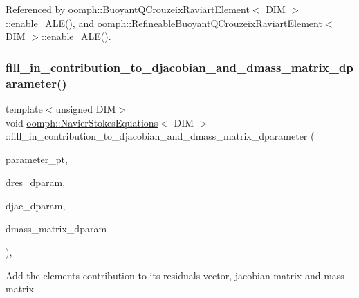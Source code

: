 Referenced by oomph\+::\+Buoyant\+Q\+Crouzeix\+Raviart\+Element$<$ D\+I\+M $>$\+::enable\+\_\+\+A\+L\+E(), and oomph\+::\+Refineable\+Buoyant\+Q\+Crouzeix\+Raviart\+Element$<$ D\+I\+M $>$\+::enable\+\_\+\+A\+L\+E().

\mbox{\label{classoomph_1_1NavierStokesEquations_afc1a9658058fb9183b89e5d3a4dabee0}} 
\subsubsection{\texorpdfstring{fill\+\_\+in\+\_\+contribution\+\_\+to\+\_\+djacobian\+\_\+and\+\_\+dmass\+\_\+matrix\+\_\+dparameter()}{fill\_in\_contribution\_to\_djacobian\_and\_dmass\_matrix\_dparameter()}}
{\footnotesize\ttfamily template$<$unsigned D\+IM$>$ \\
void \hyperlink{classoomph_1_1NavierStokesEquations}{oomph\+::\+Navier\+Stokes\+Equations}$<$ D\+IM $>$\+::fill\+\_\+in\+\_\+contribution\+\_\+to\+\_\+djacobian\+\_\+and\+\_\+dmass\+\_\+matrix\+\_\+dparameter (\begin{DoxyParamCaption}\item[{double $\ast$const \&}]{parameter\+\_\+pt,  }\item[{\hyperlink{classoomph_1_1Vector}{Vector}$<$ double $>$ \&}]{dres\+\_\+dparam,  }\item[{\hyperlink{classoomph_1_1DenseMatrix}{Dense\+Matrix}$<$ double $>$ \&}]{djac\+\_\+dparam,  }\item[{\hyperlink{classoomph_1_1DenseMatrix}{Dense\+Matrix}$<$ double $>$ \&}]{dmass\+\_\+matrix\+\_\+dparam }\end{DoxyParamCaption})\hspace{0.3cm}{\ttfamily [inline]}, {\ttfamily [virtual]}}

Add the element\textquotesingle{}s contribution to its residuals vector, jacobian matrix and mass matrix 

